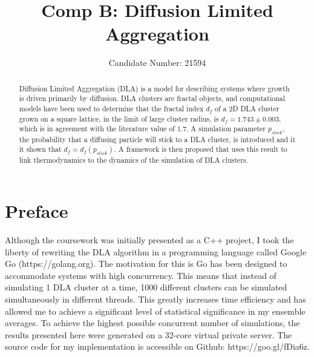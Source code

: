 \documentclass[11pt]{iopart}
\begin{document}
\setlength{\marginparwidth}{1.5cm}

\title[]{Comp B: Diffusion Limited Aggregation}

\author{Candidate Number: 21594}

\address{Department of Physics,
University of Bath, Bath BA2 7AY, United Kingdom}
\begin{abstract}
Diffusion Limited Aggregation (DLA) is a model for describing systems where growth is driven primarily by diffusion. DLA clusters are fractal objects, and computational models have been used to determine that the fractal index $d_f$ of a 2D DLA cluster grown on a square lattice, in the limit of large cluster radius, is $d_f = 1.743 \pm 0.003$, which is in agreement with the literature value of 1.7\cite{fractalindexref}. A simulation parameter $p_{stick}$, the probability that a diffusing particle will stick to a DLA cluster, is introduced and it it shown that $d_f = d_f(p_{stick})$. A framework is then proposed that uses this result to link thermodynamics to the dynamics of the simulation of DLA clusters.
\end{abstract}



\section*{Preface}
Although the coursework was initially presented as a C++ project, I took the liberty of rewriting the DLA algorithm in a programming language called Google Go (https://golang.org). The motivation for this is Go has been designed to accommodate systems with high concurrency. This means that instead of simulating 1 DLA cluster at a time, 1000 different clusters can be simulated simultaneously in different threads. This greatly increases time efficiency and has allowed me to achieve a significant level of statistical significance in my ensemble averages. To achieve the highest possible concurrent number of simulations, the results presented here were generated on a 32-core virtual private server. The source code for my implementation is accessible on Github: https://goo.gl/fDia6z.
\end{document}
